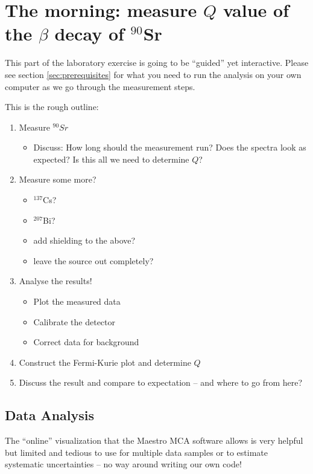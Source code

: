 \documentclass[a4,11pt, notitlepage]{article}
\begin{document}
\section{The morning: measure $Q$ value of the $\beta$ decay of $^{90}$Sr}
This part of the laboratory exercise is going to be ``guided'' yet
interactive. Please see section \ref{sec:prerequisites} for what you
need to run the analysis on your own computer as we go through the measurement steps.

This is the rough outline:
\begin{enumerate}
\item Measure $^{90}Sr$
  \begin{itemize}
  \item Discuss: How long should the measurement run? Does the spectra
    look as expected? Is this all we need to determine $Q$?
  \end{itemize}
\item Measure some more?
  \begin{itemize}
  \item $^{137}$Cs?
  \item $^{207}$Bi?
  \item add shielding to the above?
  \item leave the source out completely?
  \end{itemize}
\item Analyse the results!
  \begin{itemize}
  \item Plot the measured data
  \item Calibrate the detector
  \item Correct data for background
  \end{itemize}
\item Construct the Fermi-Kurie plot and determine $Q$
\item Discuss the result and compare to expectation -- and where to go
  from here?
\end{enumerate}

\subsection{Data Analysis}
\label{sec:data-analysis}

The ``online'' visualization that the Maestro MCA software allows is
very helpful but limited and tedious to use for multiple data samples
or to estimate systematic uncertainties
-- no way around writing our own code!
\end{document}
